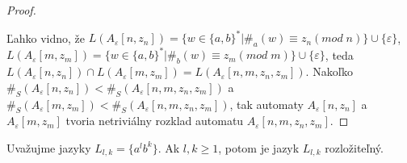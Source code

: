 \begin{proof}
\begin{enumerate}
\end{enumerate}
Ľahko vidno, že $ L(A_{\varepsilon}[n,z_n]) = \lbrace w \in \lbrace a,b \rbrace^{*} | \#_a(w) \equiv z_n (mod \; n) \rbrace \cup \lbrace \varepsilon \rbrace $, $ L(A_{\varepsilon}[m,z_m]) = \lbrace w \in \lbrace a,b \rbrace^{*} | \#_b(w) \equiv z_m (mod \; m) \rbrace \cup \lbrace \varepsilon \rbrace $, teda $ L(A_{\varepsilon}[n,z_n]) \cap L(A_{\varepsilon}[m,z_m]) = L(A_{\varepsilon}[n,m,z_n,z_m]) $. Nakoľko $ \#_S(A_{\varepsilon}[n,z_n]) < \#_S(A_{\varepsilon}[n,m,z_n,z_m]) $ a $ \#_S(A_{\varepsilon}[m,z_m]) < \#_S(A_{\varepsilon}[n,m,z_n,z_m]) $, tak automaty $ A_{\varepsilon}[n,z_n] $ a $ A_{\varepsilon}[m,z_m] $ tvoria netriviálny rozklad automatu $ A_{\varepsilon}[n,m,z_n,z_m] $.
\end{proof}

\begin{proposition}
Uvažujme jazyky $ L_{l,k} = \lbrace a^lb^k \rbrace $. Ak $ l,k \geq 1 $, potom je jazyk $ L_{l,k} $ rozložiteľný.
\end{proposition}

